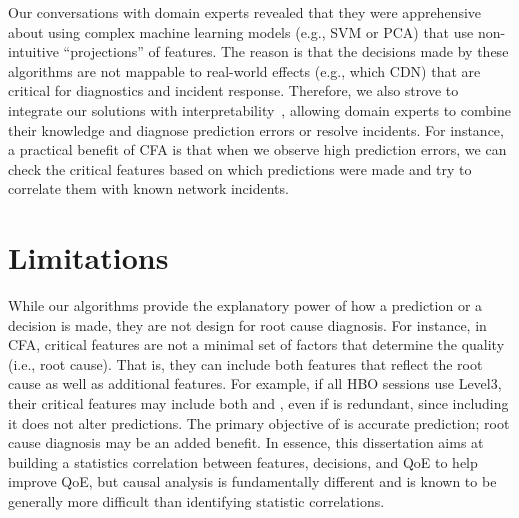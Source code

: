 


Our conversations with domain experts revealed that they 
were apprehensive about using complex machine learning 
models (e.g., SVM or PCA) that use non-intuitive ``projections'' 
of features. The reason is that the decisions made by these 
algorithms are not mappable 
to real-world effects (e.g., which CDN) that are 
critical for diagnostics and incident response.
Therefore, we also strove to integrate our solutions with
interpretability~\cite{vellido2012making}, 
allowing domain experts to combine
their knowledge and diagnose prediction
errors or resolve incidents.
For instance, a practical benefit of CFA is that when we observe
high prediction errors, we can check the critical features
based on which predictions were made and try to correlate them 
with known network incidents.


\section{Limitations}

While our algorithms provide the explanatory power of how a 
prediction or a decision is made, they are not design for 
root cause diagnosis.
For instance, in CFA, critical features are not a minimal set of
factors that determine the quality (i.e., root cause).
That is, they can include both features that reflect
the root cause as well as additional features.
For example, if all HBO sessions use Level3, their
critical features may include both \fCDN and \fSite,
even if \fCDN is redundant, since including it does
not alter predictions.
The primary objective of \dda is accurate prediction;
root cause diagnosis may be an added benefit.
In essence, this dissertation aims at building a 
statistics correlation between features, decisions,
and QoE to help improve QoE, but causal analysis is 
fundamentally different and is known to be generally
more difficult than identifying statistic correlations.

